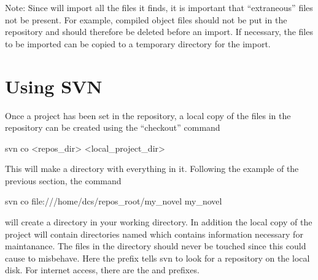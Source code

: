 Note: Since \svn will import all the files it finds, it is important
that ``extraneous'' files not be present. For example, compiled object
files should not be put in the repository and should therefore be
deleted before an import. If necessary, the files to be imported can be
copied to a temporary directory for the import.

\section{Using SVN}
\label{s:svn.use}

Once a project has been set in the repository,
a local copy of the files in the
repository can be created using the ``checkout'' command
\begin{example}
  svn co <repos_dir> <local_project_dir>
\end{example}
This will make a directory  with everything in it.
Following the example of the previous section, the command
\begin{example}
  svn co file:///home/dcs/repos_root/my_novel my_novel
\end{example}
will create a  directory in your working directory.
In addition the local copy of the project  will contain directories
named  which contains information necessary for maintanance.
The files in the  directory should never be touched since
this could cause \svn to misbehave. Here the  prefix
tells svn to look for a repository on the local disk. For internet
access, there are the  and  prefixes.

